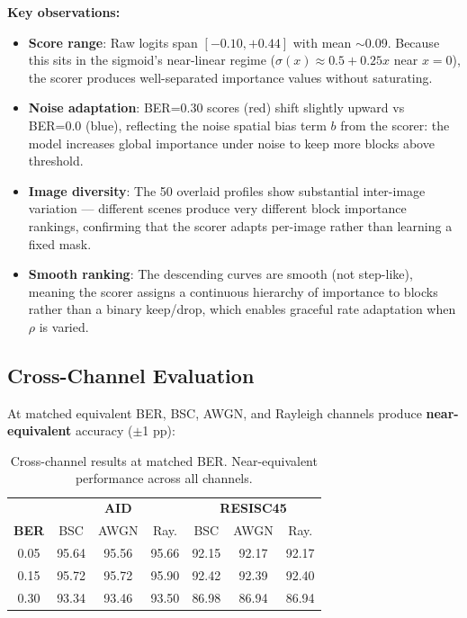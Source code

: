 \documentclass[11pt]{article}
\begin{document}
\textbf{Key observations:}
\begin{itemize}[nosep]
    \item \textbf{Score range}: Raw logits span $[-0.10, +0.44]$ with mean $\sim$0.09. Because this sits in the sigmoid's near-linear regime ($\sigma(x) \approx 0.5 + 0.25x$ near $x{=}0$), the scorer produces well-separated importance values without saturating.
    \item \textbf{Noise adaptation}: BER=0.30 scores (red) shift slightly upward vs BER=0.0 (blue), reflecting the noise spatial bias term $b$ from the scorer: the model increases global importance under noise to keep more blocks above threshold.
    \item \textbf{Image diversity}: The 50 overlaid profiles show substantial inter-image variation --- different scenes produce very different block importance rankings, confirming that the scorer adapts per-image rather than learning a fixed mask.
    \item \textbf{Smooth ranking}: The descending curves are smooth (not step-like), meaning the scorer assigns a continuous hierarchy of importance to blocks rather than a binary keep/drop, which enables graceful rate adaptation when $\rho$ is varied.
\end{itemize}

\subsection{Cross-Channel Evaluation}

At matched equivalent BER, BSC, AWGN, and Rayleigh channels produce \textbf{near-equivalent} accuracy ($\pm$1 pp):

\begin{table}[H]
\centering
\caption{Cross-channel results at matched BER. Near-equivalent performance across all channels.}
\begin{tabular}{c ccc ccc}
\toprule
& \multicolumn{3}{c}{\textbf{AID}} & \multicolumn{3}{c}{\textbf{RESISC45}} \\
\textbf{BER} & BSC & AWGN & Ray. & BSC & AWGN & Ray. \\
\midrule
0.05 & 95.64 & 95.56 & 95.66 & 92.15 & 92.17 & 92.17 \\
0.15 & 95.72 & 95.72 & 95.90 & 92.42 & 92.39 & 92.40 \\
0.30 & 93.34 & 93.46 & 93.50 & 86.98 & 86.94 & 86.94 \\
\bottomrule
\end{tabular}
\end{table}
\end{document}
